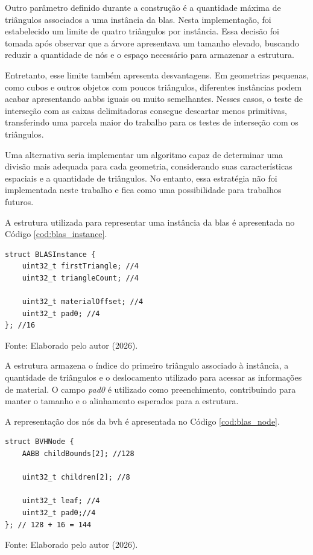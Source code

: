 Outro parâmetro definido durante a construção é a quantidade máxima de triângulos associados a uma instância da \gls{blas}. Nesta implementação, foi estabelecido um limite de quatro triângulos por instância. Essa decisão foi tomada após observar que a árvore apresentava um tamanho elevado, buscando reduzir a quantidade de nós e o espaço necessário para armazenar a estrutura.

Entretanto, esse limite também apresenta desvantagens. Em geometrias pequenas, como cubos e outros objetos com poucos triângulos, diferentes instâncias podem acabar apresentando \glspl{aabb} iguais ou muito semelhantes. Nesses casos, o teste de interseção com as caixas delimitadoras consegue descartar menos primitivas, transferindo uma parcela maior do trabalho para os testes de interseção com os triângulos.

Uma alternativa seria implementar um algoritmo capaz de determinar uma divisão mais adequada para cada geometria, considerando suas características espaciais e a quantidade de triângulos. No entanto, essa estratégia não foi implementada neste trabalho e fica como uma possibilidade para trabalhos futuros.

A estrutura utilizada para representar uma instância da \gls{blas} é apresentada no Código \ref{cod:blas_instance}.

\begin{lstlisting}[caption={\textit{Struct} da instância da \gls{blas}}, label={cod:blas_instance}]
struct BLASInstance {
    uint32_t firstTriangle; //4
    uint32_t triangleCount; //4

    uint32_t materialOffset; //4
    uint32_t pad0; //4
}; //16
\end{lstlisting}
{\normalsize
Fonte: Elaborado pelo autor (2026).
}

A estrutura armazena o índice do primeiro triângulo associado à instância, a quantidade de triângulos e o deslocamento utilizado para acessar as informações de material. O campo \textit{pad0} é utilizado como preenchimento, contribuindo para manter o tamanho e o alinhamento esperados para a estrutura.

A representação dos nós da \gls{bvh} é apresentada no Código \ref{cod:blas_node}.

\begin{lstlisting}[caption={\textit{Struct} do nó da \gls{blas}}, label={cod:blas_node}]
struct BVHNode {
    AABB childBounds[2]; //128

    uint32_t children[2]; //8

    uint32_t leaf; //4
    uint32_t pad0;//4
}; // 128 + 16 = 144
\end{lstlisting}
{\normalsize
Fonte: Elaborado pelo autor (2026).
}

